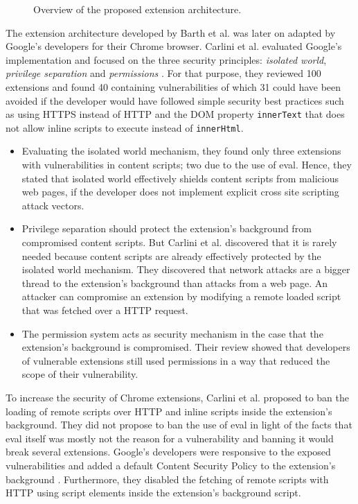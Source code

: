 	\begin{figure}[h]
		\centering
		\def\svgscale{0.8}
		
		\caption{Overview of the proposed extension architecture.}
		\label{fig:barthOverview}
	\end{figure}
	
	The extension architecture developed by Barth et al. was later on adapted by Google's developers for their Chrome browser. Carlini et al. evaluated Google's implementation and focused on the three security principles: \textit{isolated world}, \textit{privilege separation} and \textit{permissions} \cite{Carlini:2012:EGC:2362793.2362800}. For that purpose, they reviewed 100 extensions and found 40 containing vulnerabilities of which 31 could have been avoided if the developer would have followed simple security best practices such as using HTTPS instead of HTTP and the DOM property \texttt{innerText} that does not allow inline scripts to execute instead of \texttt{innerHtml}. 
	
	\begin{itemize}
		\item Evaluating the isolated world mechanism, they found only three extensions with vulnerabilities in content scripts; two due to the use of eval. Hence, they stated that isolated world effectively shields content scripts from malicious web pages, if the developer does not implement explicit cross site scripting attack vectors.
		
		\item Privilege separation should protect the extension's background from compromised content scripts. But Carlini et al. discovered that it is rarely needed because content scripts are already effectively protected by the isolated world mechanism. They discovered that network attacks are a bigger thread to the extension's background than attacks from a web page. An attacker can compromise an extension by modifying a remote loaded script that was fetched over a HTTP request. 
		
		\item The permission system acts as security mechanism in the case that the extension's background is compromised. Their review showed that developers of vulnerable extensions still used permissions in a way that reduced the scope of their vulnerability. 
	\end{itemize} 

	To increase the security of Chrome extensions, Carlini et al. proposed to ban the loading of remote scripts over HTTP and inline scripts inside the extension's background. They did not propose to ban the use of eval in light of the facts that eval itself was mostly not the reason for a vulnerability and banning it would break several extensions. Google's developers were responsive to the exposed vulnerabilities and added a default Content Security Policy to the extension's background \cite{chromiumBlogCSP}. Furthermore, they disabled the fetching of remote scripts with HTTP using script elements inside the extension's background script. 
 
